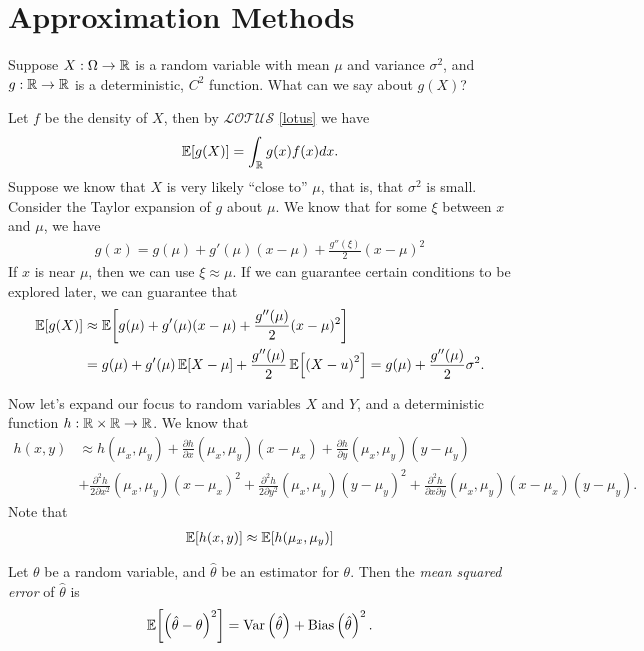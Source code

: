 \section{Approximation Methods}

Suppose $X: \Omega \to \mathbb{R}$ is a random variable with mean $\mu$ and variance $\sigma^2$, and $g: \mathbb{R} \to \mathbb{R}$ is a deterministic, $C^2$ function. What can we say about $g(X)$?

Let $f$ be the density of $X$, then by $\mathcal{LOTUS}$ \ref{lotus} we have
\begin{align*}
    \operatorname{\mathbb{E}}\!\left[{g(X)}\right] = \int_{\mathbb{R}}g(x)f(x)dx.
\end{align*}
Suppose we know that $X$ is very likely ``close to'' $\mu$, that is, that $\sigma^2$ is small. Consider the Taylor expansion of $g$ about $\mu$. We know that for some $\xi$ between $x$ and $\mu$, we have
\begin{align*}
    g(x) = g(\mu) + g'(\mu)(x-\mu) + \frac{g''(\xi)}{2}(x-\mu)^2
\end{align*}
If $x$ is near $\mu$, then we can use $\xi \approx \mu$. If we can guarantee certain conditions to be explored later, we can guarantee that
\begin{align*}
    \operatorname{\mathbb{E}}\!\left[{g(X)}\right] &\approx \operatorname{\mathbb{E}}\!\left[{g(\mu) + g'(\mu)(x-\mu) + \frac{g''(\mu)}{2}(x-\mu)^2}\right] \\
    &= g(\mu) + g'(\mu)\operatorname{\mathbb{E}}\!\left[{X - \mu}\right] + \frac{g''(\mu)}{2}\operatorname{\mathbb{E}}\!\left[{\left(X - u\right)^2}\right] = g(\mu) + \frac{g''(\mu)}{2}\sigma^2.
\end{align*}

Now let's expand our focus to random variables $X$ and $Y$, and a deterministic function $h: \mathbb{R} \times \mathbb{R} \to \mathbb{R}$. We know that
\begin{align*}
    h(x, y) &\approx h(\mu_x, \mu_y) + \frac{\partial h}{\partial x}\left(\mu_x, \mu_y\right)(x - \mu_x) + \frac{\partial h}{\partial y}\left(\mu_x, \mu_y\right)(y - \mu_y) \\
    &+ \frac{\partial^2h}{2\partial x^2}(\mu_x, \mu_y)\left(x - \mu_x\right)^2 + \frac{\partial^2h}{2\partial y^2}(\mu_x, \mu_y)\left(y - \mu_y\right)^2 + \frac{\partial^2h}{\partial x\partial y}(\mu_x, \mu_y)\left(x - \mu_x\right)\left(y - \mu_y\right).
\end{align*}
Note that
\begin{align*}
    \operatorname{\mathbb{E}}\!\left[{h(x, y)}\right] \approx \operatorname{\mathbb{E}}\!\left[{h(\mu_x, \mu_y)}\right]
\end{align*}

\begin{thm}
    Let $\theta$ be a random variable, and $\hat{\theta}$ be an estimator for $\theta$. Then the \emph{mean squared error} of $\hat{\theta}$ is
    \begin{align*}
        \operatorname{\mathbb{E}}\!\left[{\left(\hat{\theta} - \theta\right)^2}\right] = \operatorname{Var}\left(\hat{\theta}\right) + \operatorname{Bias}\left(\hat{\theta}\right)^2.
    \end{align*}
\end{thm}

